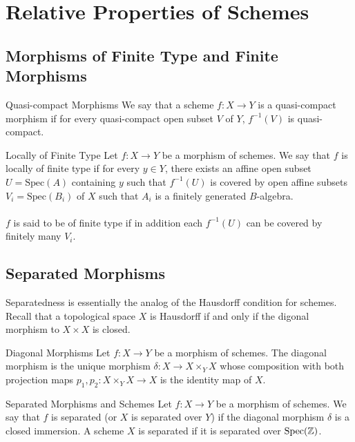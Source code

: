 \documentclass[a4paper]{article}
\begin{document}
\pagebreak
\section{Relative Properties of Schemes}
\subsection{Morphisms of Finite Type and Finite Morphisms}
\begin{defn}{Quasi-compact Morphisms}{} We say that a scheme $f:X\to Y$ is a quasi-compact morphism if for every quasi-compact open subset $V$ of $Y$, $f^{-1}(V)$ is quasi-compact. 
\end{defn}

\begin{defn}{Locally of Finite Type}{} Let $f:X\to Y$ be a morphism of schemes. We say that $f$ is locally of finite type if for every $y\in Y$, there exists an affine open subset $U=\text{Spec}(A)$ containing $y$ such that $f^{-1}(U)$ is covered by open affine subsets $V_i=\text{Spec}(B_i)$ of $X$ such that $A_i$ is a finitely generated $B$-algebra. \\~\\

$f$ is said to be of finite type if in addition each $f^{-1}(U)$ can be covered by finitely many $V_i$. 
\end{defn}

\subsection{Separated Morphisms}
Separatedness is essentially the analog of the Hausdorff condition for schemes. Recall that a topological space $X$ is Hausdorff if and only if the digonal morphism to $X\times X$ is closed. 

\begin{defn}{Diagonal Morphisms}{} Let $f:X\to Y$ be a morphism of schemes. The diagonal morphism is the unique morphism $\delta:X\to X\times_Y X$ whose composition with both projection maps $p_1,p_2:X\times_Y X\to X$ is the identity map of $X$. 
\end{defn}

\begin{defn}{Separated Morphisms and Schemes}{} Let $f:X\to Y$ be a morphism of schemes. We say that $f$ is separated (or $X$ is separated over $Y$) if the diagonal morphism $\delta$ is a closed immersion. A scheme $X$ is separated if it is separated over $\text{Spec}(\mathbb{Z})$. 
\end{defn}
\end{document}
